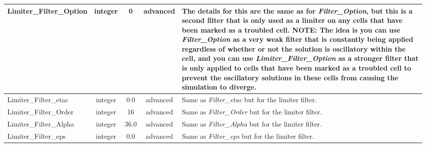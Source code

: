 \documentclass[letterpaper,10pt]{article}
\newcommand{\sladv}{advanced}
\newcommand{\typint}{integer}
\newcommand{\typflt}{integer}
\newcommand{\minorline}{\hline}
\newcommand{\groupline}[1]{}
\newlength{\colEwidth}
\newcommand{\descriptionbegin}{}
\newcommand{\descriptionend}{\\ \minorline}
\newcommand{\NOTE}{\newline \textcolor{OrangeRed3}{\textbf{NOTE: }}}
\begin{document}
\begin{longtable}{ | l | c | c | c | p{\colEwidth} | }
    \groupline{LIMITER FILTER OPTIONS}
    Limiter\_Filter\_Option & \typint & 0    & \sladv &
    \descriptionbegin
    The details for this are the same as for \textsl{Filter\_Option}, but this
    is a second filter that is only used as a limiter on any cells that have
    been marked as a troubled cell.
    \NOTE The idea is you can use \textsl{Filter\_Option} as a very weak filter
    that is constantly being applied regardless of whether or not the solution
    is oscillatory within the cell, and you can use
    \textsl{Limiter\_Filter\_Option} as a stronger filter that is only applied
    to cells that have been marked as a troubled cell to prevent the oscillatory
    solutions in these cells from causing the simulation to diverge.
    \descriptionend
    Limiter\_Filter\_etac   & \typflt & 0.0  & \sladv &
    \descriptionbegin
    Same as \textsl{Filter\_etac} but for the limiter filter.
    \descriptionend
    Limiter\_Filter\_Order  & \typint & 16   & \sladv &
    \descriptionbegin
    Same as \textsl{Filter\_Order} but for the limiter filter.
    \descriptionend
    Limiter\_Filter\_Alpha  & \typflt & 36.0 & \sladv &
    \descriptionbegin
    Same as \textsl{Filter\_Alpha} but for the limiter filter.
    \descriptionend
    Limiter\_Filter\_eps    & \typflt & 0.0  & \sladv &
    \descriptionbegin
    Same as \textsl{Filter\_eps} but for the limiter filter.
    \descriptionend


\end{longtable}
\end{document}
